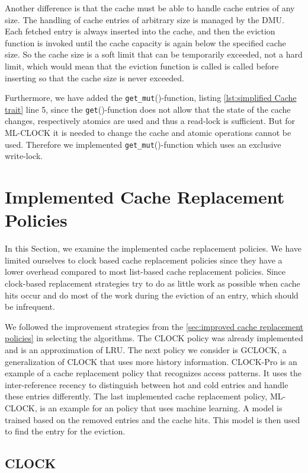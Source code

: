 \documentclass[
	12pt,
	a4paper,
	abstract,
	bibliography=totoc,
	chapterprefix,
	headings=openright,
	numbers=endperiod,
	parskip=half,
	twoside,
]{scrreprt}
\begin{document}
Another difference is that the cache must be able to handle cache entries of any size.
The handling of cache entries of arbitrary size is managed by the DMU.
Each fetched entry is always inserted into the cache, and then the eviction function is invoked until the cache capacity is again below the specified cache size.
So the cache size is a soft limit that can be temporarily exceeded, not a hard limit, which would mean that the eviction function is called
is called before inserting so that the cache size is never exceeded.

Furthermore, we have added the \texttt{get\_mut}()-function, listing \ref{lst:simplified Cache trait} line 5, 
since the \texttt{get}()-function does not allow that the state of the cache changes, respectively atomics are used and thus a read-lock is sufficient.
But for ML-CLOCK it is needed to change the cache and atomic operations cannot be used.
Therefore we implemented \texttt{get\_mut}()-function which uses an exclusive write-lock.

\section{Implemented Cache Replacement Policies}
\label{sec:implemented cache replacement policies}

In this Section, we examine the implemented cache replacement policies.
We have limited ourselves to clock based cache replacement policies since they have a lower overhead compared
to most list-based cache replacement policies.
Since clock-based replacement strategies try to do as little work as possible when cache hits occur and 
do most of the work during the eviction of an entry, which should be infrequent.

We followed the improvement strategies from the \cref{sec:improved cache replacement policies}
in selecting the algorithms.
The CLOCK policy was already implemented and is an approximation of LRU.
The next policy we consider is GCLOCK, a generalization of CLOCK that uses more history information.
CLOCK-Pro is an example of a cache replacement policy that recognizes access patterns.
It uses the inter-reference recency to distinguish between hot and cold entries and handle these entries differently.
The last implemented cache replacement policy, ML-CLOCK, is an example for an policy that uses machine learning.
A model is trained based on the removed entries and the cache hits. 
This model is then used to find the entry for the eviction.

\subsection{CLOCK}
\end{document}
